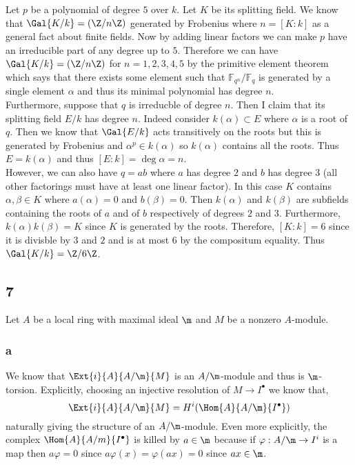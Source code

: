 \documentclass[12pt]{article}
\renewcommand{\F}{\mathbb{F}}
\begin{document}
Let $p$ be a polynomial of degree $5$ over $k$. Let $K$ be its splitting field. We know that $\Gal{K/k} = (\Z / n \Z)$ generated by Frobenius where $n = [K : k]$ as a general fact about finite fields. Now by adding linear factors we can make $p$ have an irreducible part of any degree up to $5$. Therefore we can have $\Gal{K/k} = (\Z / n \Z)$ for $n = 1,2,3,4,5$ by the primitive element theorem which says that there exists some element such that $\F_{q^n} / \F_q$ is generated by a single element $\alpha$ and thus its minimal polynomial has degree $n$.
\bigskip\\
Furthermore, suppose that $q$ is irreducble of degree $n$. Then I claim that its splitting field $E/k$ has degree $n$. Indeed consider $k(\alpha) \subset E$ where $\alpha$ is a root of $q$. Then we know that $\Gal{E/k}$ acts transitively on the roots but this is generated by Frobenius and $\alpha^p \in k(\alpha)$ so $k(\alpha)$ contains all the roots. Thus $E = k(\alpha)$ and thus $[E : k] = \deg{\alpha} = n$. 
\bigskip\\
However, we can also have $q = ab$ where $a$ has degree $2$ and $b$ has degree $3$ (all other factorings must have at least one linear factor). In this case $K$ contains $\alpha, \beta \in K$ where $a(\alpha) = 0$ and $b(\beta) = 0$. Then $k(\alpha)$ and $k(\beta)$ are subfields containing the roots of $a$ and of $b$ respectively of degrees $2$ and $3$. Furthermore, $k(\alpha) k(\beta) = K$ since $K$ is generated by the roots. Therefore, $[K : k] = 6$ since it is divisble by $3$ and $2$ and is at most $6$ by the compositum equality. Thus $\Gal{K/k} = \Z / 6 \Z$. 

\subsection{7}

Let  $A$ be a local ring with maximal ideal $\m$ and $M$ be a nonzero $A$-module. 

\subsubsection{a}

We know that $\Ext{i}{A}{A/\m}{M}$ is an $A/\m$-module and thus is $\m$-torsion. Explicitly, choosing an injective resolution of $M \to I^\bullet$ we know that,
\[ \Ext{i}{A}{A/\m}{M} = H^i(\Hom{A}{A/\m}{I^\bullet}) \]
naturally giving the structure of an $A / \m$-module. Even more explicitly, the complex $\Hom{A}{A/m}{I^\bullet}$ is killed by $a \in \m$ because if $\varphi : A / \m \to I^i$ is a map then $a \varphi = 0$ since $a \varphi(x) = \varphi(ax) = 0$ since $ax \in \m$.
\end{document}
